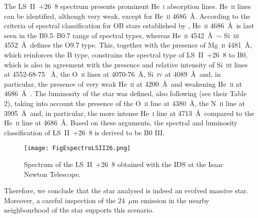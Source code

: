 \documentclass[fleqn,usenatbib]{mnras}
\begin{document}
The LS~II~+26~8 spectrum presents prominent He~\textsc{i} absorption lines. He~\textsc{ii} 
lines can be identified, although very weak, except for He~\textsc{ii} 4686~\AA. According to 
the criteria of spectral classification for OB stars established by \cite{wal90}, He~\textsc{ii} 
4686~\AA~is last seen in the B0.5--B0.7 range of spectral types, whereas He~\textsc{ii} 4542~\AA~$\sim$ Si~\textsc{iii} 
4552~\AA~defines the O9.7 type. This, together with the presence of Mg~\textsc{ii} 4481~\AA, 
which reinforces the B type, constrains the spectral type of LS~II~+26~8 to B0, which is also in 
agreement with the presence and relative intensity of Si~\textsc{iii} lines at 4552-68-75 ~\AA, 
the O~\textsc{ii} lines at 4070-76~\AA, Si~\textsc{iv} at 4089~\AA~and, in particular, 
the presence of very weak He~\textsc{ii} at 4200~\AA~and weakening He~\textsc{ii} at 4686~\AA\ 
 \citep{liu19}. The luminosity of the star was defined, also following \citet{liu19} 
(see their Table\,2), taking into account the presence of the O~\textsc{ii} line at 4380~\AA, 
the N~\textsc{ii} line at 3995~\AA~and, in particular, the more intense He~\textsc{i} line at 4713~\AA\  
compared to the He~\textsc{ii} line at 4686~\AA. Based on these arguments, the 
spectral and luminosity classification of LS~II~+26~8 is derived to be B0 III.

\begin{figure*}
	\centering
    \texttt{[image: FigEspectroLSII26.png]}
    \caption{Spectrum of the LS~II~+26~8 obtained with the IDS at the Isaac Newton Telescope.}
    \label{fig:espectro}
\end{figure*}


Therefore, we conclude that the star analysed is indeed an evolved massive star. Moreover, a 
careful inspection of the 24~$\mu$m emission in the nearby neighbourhood of the star supports this scenario. 
\end{document}
